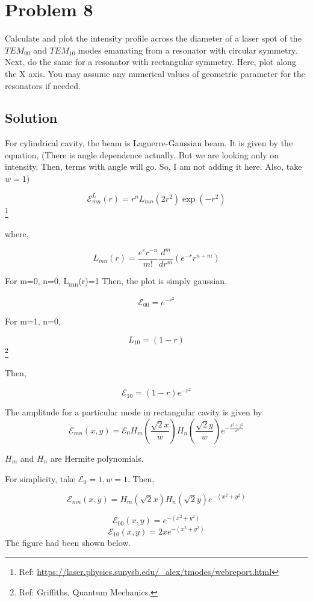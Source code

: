 \documentclass[a4paper,11pt]{article}
\begin{document}
\section*{Problem 8}
\label{sec:orgeb30244}
Calculate and plot the intensity profile across the diameter of a laser spot of the \(TEM_{00}\) and \(TEM_{10}\) modes emanating from a resonator with circular symmetry. Next, do the same for a resonator with rectangular symmetry. Here, plot along the X axis. You may assume any numerical values of geometric parameter for the resonators if needed.

\subsection*{Solution}
\label{sec:orgaa6e207}

For cylindrical cavity, the beam is Laguerre-Gaussian beam. It is given by the equation, (There is angle dependence actually. But we are looking only on intensity. Then, terms with angle will go. So, I am not adding it here. Also, take \(w=1\))

$$\mathcal{E}_{mn}^L(r) = r^n L_{mn}(2r^2)\exp(-r^2)$$ \footnote{Ref: \url{https://laser.physics.sunysb.edu/\_alex/tmodes/webreport.html}}

where,

$$L_{mn}(r) = \frac{e^r r^{-n}}{m!}\frac{d^m}{dr^m}\left(e^{-r} r^{n+m}\right)$$

For m=0, n=0, L\textsubscript{mn}(r)=1 Then, the plot is simply gaussian.

$$\mathcal{E}_{00} = e^{-r^2}$$

For m=1, n=0,

$$L_{10} =  \left( 1-r \right)$$ \footnote{Ref: Griffiths, Quantum Mechanics.}



Then,

$$\mathcal{E}_{10} = \left( 1-r  \right) e^{-r^2}$$


The amplitude for a particular mode in rectangular cavity is given by
$$\mathcal{E}_{mn}(x,y) = \mathcal{E}_0H_m\left(\frac{\sqrt{2} x}{w}\right)H_n\left(\frac{\sqrt{2} y}{w}\right)e^{-\frac{x^2+y^2}{w^2}}$$

\(H_m\) and \(H_n\) are Hermite polynomials.

For simplicity, take \(\mathcal{E}_0 = 1, w=1\). Then,

$$\mathcal{E}_{mn}(x,y) = H_m\left(\sqrt{2} x\right)H_n\left(\sqrt{2} y\right)e^{-(x^2+y^2)}$$

$$\mathcal{E}_{00}(x,y) = e^{-(x^2+y^2)}$$
$$\mathcal{E}_{10}(x,y) = 2x e^{-(x^2+y^2)}$$
The figure had been shown below.
\end{document}
